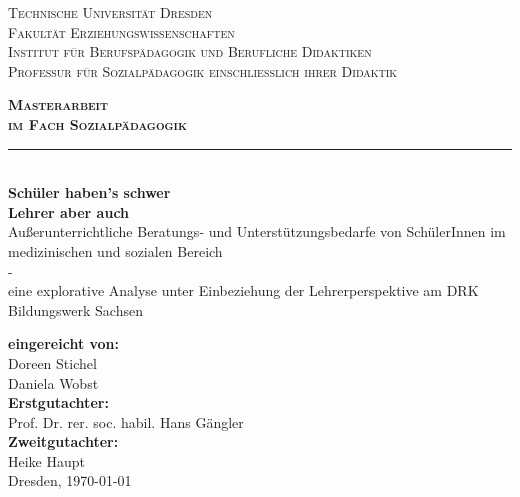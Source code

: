 \begin{titlepage}
\begin{center}
\normalsize
\scshape
Technische Universität Dresden\\
\normalsize
\upshape
Fakultät Erziehungswissenschaften\\
Institut für Berufspädagogik und Berufliche Didaktiken\\
Professur für Sozialpädagogik einschließlich ihrer Didaktik\\[2,0cm]
\end{center}

\begin{center}
\Huge
\scshape
\bfseries
Masterarbeit\\[0,5cm]
\normalsize
\mdseries
im Fach Sozialpädagogik\\
\noindent\rule{\textwidth}{1pt}\\[1cm]
\normalsize
\mdseries
\textbf{Schüler haben's schwer}\\
\textbf{Lehrer aber auch}\\[0,5cm]
\normalsize
\mdseries
Außerunterrichtliche Beratungs- und Unterstützungsbedarfe von SchülerInnen im medizinischen und sozialen Bereich\\
-\\
eine explorative Analyse unter Einbeziehung der Lehrerperspektive am DRK Bildungswerk Sachsen\\[2,0cm]
\end{center}

\begin{center}
\textbf{eingereicht von:}\\
Doreen Stichel\\
Daniela Wobst\\[1,0cm]

\textbf{Erstgutachter:}\\
Prof. Dr. rer. soc. habil. Hans Gängler\\[1,0cm]
\textbf{Zweitgutachter:} \\
Heike Haupt\\[1,0cm]

Dresden, \today
\end{center}

\end{titlepage}